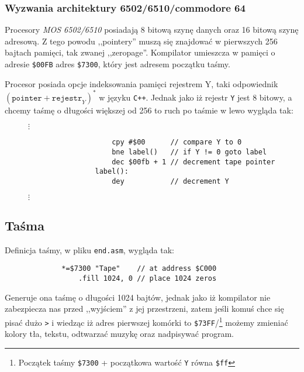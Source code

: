 \documentclass[a4paper,12pt]{article}
\begin{document}
    \subsubsection*{Wyzwania architektury 6502/6510/commodore 64}

    Procesory \emph{MOS 6502/6510} posiadają 8 bitową szynę danych oraz 16 bitową szynę adresową. Z tego powodu ,,pointery'' muszą się znajdować w pierwszych 256 bajtach pamięci, tak zwanej ,,zeropage''. Kompilator umieszcza w pamięci o adresie \texttt{\$00FB} adres \texttt{\$7300}, który jest adresem początku taśmy. 

    Procesor posiada opcje indeksowania pamięci rejestrem Y, taki odpowiednik $\left(\texttt{pointer} + \texttt{rejestr}_Y \right)^*$ w języku \texttt{C++}. Jednak jako iż rejestr \texttt{Y} jest 8 bitowy, a chcemy taśmę o długości większej od 256 to ruch po taśmie w lewo wygląda tak:

    \begin{figure}[h]
        $\vdots$
    \centering
        \begin{lstlisting}
                    cpy #$00      // compare Y to 0
                    bne label()   // if Y != 0 goto label
                    dec $00fb + 1 // decrement tape pointer
                label():
                    dey           // decrement Y
        \end{lstlisting}
        \centering
        $\vdots$
    \centering
    \end{figure}

    \subsection*{Taśma}

    Definicja taśmy, w pliku \texttt{end.asm}, wygląda tak:

    \begin{figure}[h]
        \begin{lstlisting}
        *=$7300 "Tape"    // at address $C000
            .fill 1024, 0 // place 1024 zeros
        \end{lstlisting}
    \end{figure}

    Generuje ona taśmę o długości 1024 bajtów, jednak jako iż kompilator nie zabezpiecza nas przed ,,wyjściem'' z jej przestrzeni, zatem jeśli komuś chce się pisać dużo \texttt{>} i wiedząc iż adres pierwszej komórki to \texttt{\$73FF}/\footnote{Początek taśmy \texttt{\$7300} + początkowa wartość \texttt{Y} równa \texttt{\$ff}} możemy zmieniać kolory tła, tekstu, odtwarzać muzykę oraz nadpisywać program.
\end{document}
